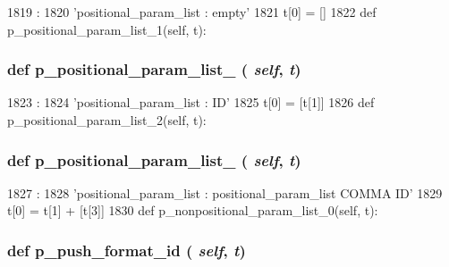 \begin{DoxyCode}
1819                                           :
1820         'positional_param_list : empty'
1821         t[0] = []
1822 
    def p_positional_param_list_1(self, t):
\end{DoxyCode}
\hypertarget{classisa__parser_1_1ISAParser_a45440a229a3e7f21099050287b61b387}{
\subsubsection[{p\_\-positional\_\-param\_\-list\_\-1}]{\setlength{\rightskip}{0pt plus 5cm}def p\_\-positional\_\-param\_\-list\_ ( {\em self}, \/   {\em t})}}
\label{classisa__parser_1_1ISAParser_a45440a229a3e7f21099050287b61b387}



\begin{DoxyCode}
1823                                           :
1824         'positional_param_list : ID'
1825         t[0] = [t[1]]
1826 
    def p_positional_param_list_2(self, t):
\end{DoxyCode}
\hypertarget{classisa__parser_1_1ISAParser_a88e0b07de00cd8856f931b5d2e153ed9}{
\subsubsection[{p\_\-positional\_\-param\_\-list\_\-2}]{\setlength{\rightskip}{0pt plus 5cm}def p\_\-positional\_\-param\_\-list\_ ( {\em self}, \/   {\em t})}}
\label{classisa__parser_1_1ISAParser_a88e0b07de00cd8856f931b5d2e153ed9}



\begin{DoxyCode}
1827                                           :
1828         'positional_param_list : positional_param_list COMMA ID'
1829         t[0] = t[1] + [t[3]]
1830 
    def p_nonpositional_param_list_0(self, t):
\end{DoxyCode}
\hypertarget{classisa__parser_1_1ISAParser_a5d4cae9753ae8b3e873a5ea3317b0799}{
\subsubsection[{p\_\-push\_\-format\_\-id}]{\setlength{\rightskip}{0pt plus 5cm}def p\_\-push\_\-format\_\-id ( {\em self}, \/   {\em t})}}
\label{classisa__parser_1_1ISAParser_a5d4cae9753ae8b3e873a5ea3317b0799}




